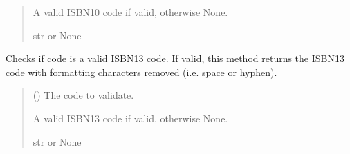 \documentclass[letterpaper,10pt,english]{sphinxmanual}
\begin{document}
\begin{fulllineitems}
\begin{fulllineitems}
\begin{quote}
\begin{description}
\sphinxAtStartPar
A valid ISBN\sphinxhyphen{}10 code if valid, otherwise None.

\sphinxAtStartPar
str or None

\end{description}\end{quote}

\end{fulllineitems}


\begin{fulllineitems}
\label{\detokenize{apache_commons_validator_python.routines:apache_commons_validator_python.routines.isbn_validator.ISBNValidator.validate_isbn13}}
\pysigstartsignatures
{}
\pysigstopsignatures
\sphinxAtStartPar
Checks if code is a valid ISBN\sphinxhyphen{}13 code. If valid, this method returns the
ISBN\sphinxhyphen{}13 code with formatting characters removed (i.e. space or hyphen).
\begin{quote}\begin{description}
\sphinxAtStartPar
{} () \textendash{} The code to validate.

\sphinxAtStartPar
A valid ISBN\sphinxhyphen{}13 code if valid, otherwise None.

\sphinxAtStartPar
str or None

\end{description}\end{quote}

\end{fulllineitems}


\end{fulllineitems}
\end{document}
